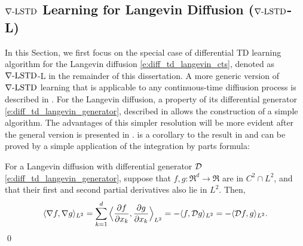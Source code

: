 \subsection{$\nabla\text{-LSTD}$ Learning for Langevin Diffusion ($\nabla\text{-LSTD}$-L)}
\label{s:diff_td_langevin}
In this Section, we first focus on the special case of differential TD learning algorithm for the Langevin diffusion \eqref{e:diff_td_langevin_cts}, denoted as $\nabla\text{-LSTD}$-L in the remainder of this dissertation. A more generic version of $\nabla\text{-LSTD}$ learning that is applicable to any continuous-time diffiusion process is described in . For the Langevin diffusion, a property of its differential generator \eqref{e:diff_td_langevin_generator},  described in  allows the construction of a simple algorithm. The advantages of this simpler resolution will be more evident after the general version is presented in .  is a corollary to the result in \cite{hwanorwu15,yanlaumehmey16} and can be proved by a simple application of the integration by parts formula:
\begin{proposition}
	\label{prop:lang_generator_grad}
	For a Langevin diffusion with differential generator ${\cal D}$ \eqref{e:diff_td_langevin_generator}, suppose that $f,g\colon\Re^d \to\Re$ are in $C^2  \cap L^2$, and that their first and second partial derivatives also lie in $L^2$. Then,
	\begin{equation}
	\langle \nabla f, \nabla g \rangle_{L^2} = \sum_{k=1}^d \Big \langle \frac{\partial f}{\partial x_k},  \frac{\partial g} {\partial x_k}\Big \rangle_{L^2}  = - \langle  f, \generate g\rangle_{L^2} = - \langle \generate f , g \rangle_{L^2}.
	\label{e:diff_td_gradDual}
	\end{equation}
	\qed
\end{proposition} 

